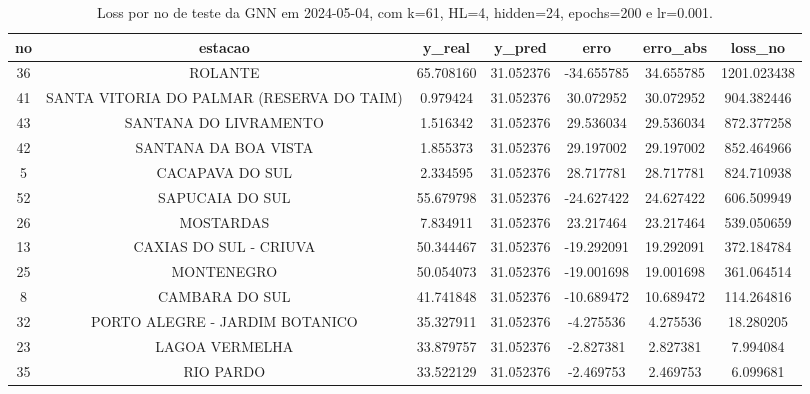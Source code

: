 \begin{table}[h]
\centering
\caption{Loss por no de teste da GNN em 2024-05-04, com k=61, HL=4, hidden=24, epochs=200 e lr=0.001.}
\label{tab:gnn_loss_k61_hl4_h24_e200_d20240504}
\begin{tabular}{ccccccc}
\toprule
no & estacao & y\_real & y\_pred & erro & erro\_abs & loss\_no \\
\midrule
36 & ROLANTE & 65.708160 & 31.052376 & -34.655785 & 34.655785 & 1201.023438 \\
41 & SANTA VITORIA DO PALMAR (RESERVA DO TAIM) & 0.979424 & 31.052376 & 30.072952 & 30.072952 & 904.382446 \\
43 & SANTANA DO LIVRAMENTO & 1.516342 & 31.052376 & 29.536034 & 29.536034 & 872.377258 \\
42 & SANTANA DA BOA VISTA & 1.855373 & 31.052376 & 29.197002 & 29.197002 & 852.464966 \\
5 & CACAPAVA DO SUL & 2.334595 & 31.052376 & 28.717781 & 28.717781 & 824.710938 \\
52 & SAPUCAIA DO SUL & 55.679798 & 31.052376 & -24.627422 & 24.627422 & 606.509949 \\
26 & MOSTARDAS & 7.834911 & 31.052376 & 23.217464 & 23.217464 & 539.050659 \\
13 & CAXIAS DO SUL - CRIUVA & 50.344467 & 31.052376 & -19.292091 & 19.292091 & 372.184784 \\
25 & MONTENEGRO & 50.054073 & 31.052376 & -19.001698 & 19.001698 & 361.064514 \\
8 & CAMBARA DO SUL & 41.741848 & 31.052376 & -10.689472 & 10.689472 & 114.264816 \\
32 & PORTO ALEGRE - JARDIM BOTANICO & 35.327911 & 31.052376 & -4.275536 & 4.275536 & 18.280205 \\
23 & LAGOA VERMELHA & 33.879757 & 31.052376 & -2.827381 & 2.827381 & 7.994084 \\
35 & RIO PARDO & 33.522129 & 31.052376 & -2.469753 & 2.469753 & 6.099681 \\
\bottomrule
\end{tabular}
\end{table}
